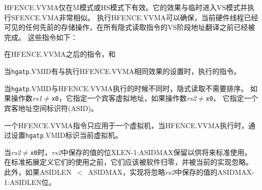 HFENCE.VVMA仅在M模式或HS模式下有效。它的效果与临时进入VS模式并执行SFENCE.VMA非常相似。
执行HFENCE.VVMA可以确保，当前硬件线程已经可见的任何先前的存储操作，在所有隐式读取指令的VS阶段地址翻译之前已经被完成。
这些指令如下：
\begin{compactitem}
\item
在HFENCE.VVMA之后的指令，和
\item
当{\tt hgatp}.VMID有与执行HFENCE.VVMA相同效果的设置时，执行的指令。
\end{compactitem}

当{\tt hgatp}.VMID与HFENCE.VVMA执行的时候不同时，隐式读取不需要排序。
如果操作数{\em rs1}$\neq${\tt x0}，它指定一个宾客虚拟地址，如果操作数{\em rs2}$\neq${\tt x0}，
它指定一个宾客地址空间标识符(ASID)。

\begin{commentary}
  一个HFENCE.VVMA指令只应用于一个虚拟机，当HFENCE.VVMA执行时，通过设置{\tt hgatp}.VMID标识当前虚拟机。
\end{commentary}

当{\em rs2}$\neq${\tt x0}时，{\em rs2}中保存的值的位XLEN-1:ASIDMAX保留以供将来标准使用。
在标准拓展定义它们的使用之前，它们应该被软件归零，并被当前的实现忽略。
此外，如果ASIDLEN~$<$~ASIDMAX，实现将忽略{\em rs2}中保存的值的ASIDMAX-1:ASIDLEN位。

